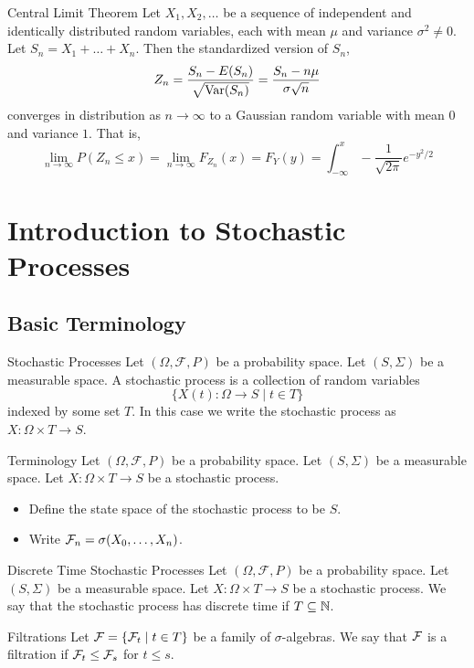 \documentclass[a4paper]{article}
\begin{document}
\begin{thm}{Central Limit Theorem}{} Let $X_1,X_2,\dots$ be a sequence of independent and identically distributed random variables, each with mean $\mu$ and variance $\sigma^2\neq 0$. Let $S_n=X_1+\dots+X_n$. Then the standardized version of $S_n$, $$Z_n=\frac{S_n-E(S_n)}{\sqrt{\operatorname{Var}(S_n)}}=\frac{S_n-n\mu}{\sigma\sqrt{n}}$$ converges in distribution as $n\to\infty$ to a Gaussian random variable with mean $0$ and variance $1$. That is, $$\lim_{n\to\infty}P(Z_n\leq x)=\lim_{n\to\infty}F_{Z_n}(x)=F_Y(y)=\int_{-\infty}^{x}-\frac{1}{\sqrt{2\pi}}e^{-y^2/2}$$
\end{thm}

\pagebreak
\section{Introduction to Stochastic Processes}
\subsection{Basic Terminology}
\begin{defn}{Stochastic Processes}{} Let $(\Omega,\mathcal{F},P)$ be a probability space. Let $(S,\Sigma)$ be a measurable space. A stochastic process is a collection of random variables $$\{X(t):\Omega\to S\;|\;t\in T\}$$ indexed by some set $T$. In this case we write the stochastic process as $X:\Omega\times T\to S$. 
\end{defn}

\begin{defn}{Terminology}{} Let $(\Omega,\mathcal{F},P)$ be a probability space. Let $(S,\Sigma)$ be a measurable space. Let $X:\Omega\times T\to S$ be a stochastic process. 
\begin{itemize}
\item Define the state space of the stochastic process to be $S$. 
\item Write $\mathcal{F}_n=\sigma(X_0,\dots,X_n)$. 
\end{itemize}
\end{defn}

\begin{defn}{Discrete Time Stochastic Processes}{} Let $(\Omega,\mathcal{F},P)$ be a probability space. Let $(S,\Sigma)$ be a measurable space. Let $X:\Omega\times T\to S$ be a stochastic process. We say that the stochastic process has discrete time if $T\subseteq\mathbb{N}$. 
\end{defn}

\begin{defn}{Filtrations}{} Let $\mathcal{F}=\{\mathcal{F}_t\;|\;t\in T\}$ be a family of $\sigma$-algebras. We say that $\mathcal{F}$ is a filtration if $\mathcal{F}_t\leq\mathcal{F}_s$ for $t\leq s$. 
\end{defn}
\end{document}
